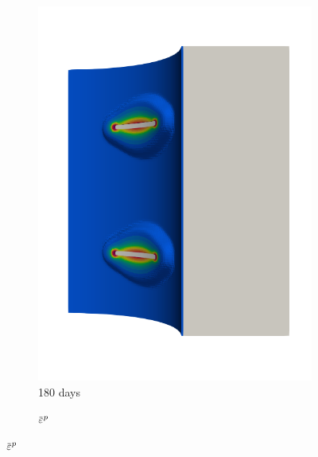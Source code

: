 \begin{figure}[!htb]
\begin{subfigure}[b]{0.2\textwidth}
    \includegraphics[width=\textwidth]{Chapter5/figures/spallation/seed_ep_4}
    \caption{180 days}
  \end{subfigure}
  \begin{subfigure}[b]{0.1\textwidth}
    \centering
    \caption*{$\ep$}

\end{subfigure}
\end{figure}
